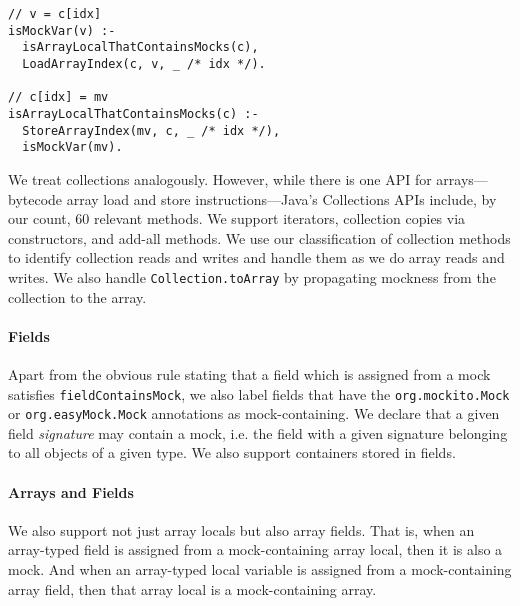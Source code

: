 \begin{lstlisting}[basicstyle=\ttfamily\small,numbers=none,caption={Rules for handling arrays.}]
// v = c[idx]
isMockVar(v) :-
  isArrayLocalThatContainsMocks(c),
  LoadArrayIndex(c, v, _ /* idx */).

// c[idx] = mv
isArrayLocalThatContainsMocks(c) :-
  StoreArrayIndex(mv, c, _ /* idx */),
  isMockVar(mv).
\end{lstlisting}

We treat collections analogously. However, while there is one API for arrays---bytecode array load and store instructions---Java's Collections APIs include, by our count, 60 relevant methods. We support iterators, collection copies via constructors, and add-all methods. We use our classification of collection methods to identify collection reads and writes and handle them as we do array reads and writes. We also handle {\tt Collection.toArray} by propagating mockness from the collection to the array.%

\paragraph{Fields} Apart from the obvious rule stating that a field which is assigned from a mock satisfies {\tt fieldContainsMock}, we also label fields that have the {\tt org.mockito.Mock} or {\tt org.easyMock.Mock} annotations as mock-containing. We declare that a given field \emph{signature} may contain a mock, i.e. the field with a given signature belonging to all objects of a given type. We also support containers stored in fields.

\paragraph{Arrays and Fields} We also support not just array locals but also array fields. That is, when an array-typed field is assigned from a mock-containing array local, then it is also a mock. And when an array-typed local variable is assigned from a mock-containing array field, then that array local is a mock-containing array.

